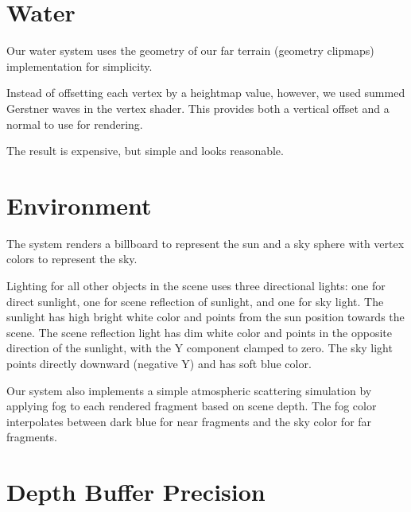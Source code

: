 \section{Water} \label{sec:water} %


Our water system uses the geometry of our far terrain (geometry clipmaps) implementation for simplicity.

Instead of offsetting each vertex by a heightmap value, however, we used summed Gerstner waves in the vertex shader.
This provides both a vertical offset and a normal to use for rendering.

The result is expensive, but simple and looks reasonable.


\section{Environment} \label{sec:env} %

The system renders a billboard to represent the sun and a sky sphere with vertex colors to represent the sky.

Lighting for all other objects in the scene uses three directional lights: one for direct sunlight, one for scene reflection of sunlight, and one for sky light.
The sunlight has high bright white color and points from the sun position towards the scene.
The scene reflection light has dim white color and points in the opposite direction of the sunlight, with the Y component clamped to zero.
The sky light points directly downward (negative Y) and has soft blue color.

Our system also implements a simple atmospheric scattering simulation by applying fog to each rendered fragment based on scene depth.
The fog color interpolates between dark blue for near fragments and the sky color for far fragments.


\section{Depth Buffer Precision} \label{sec:prec} %

